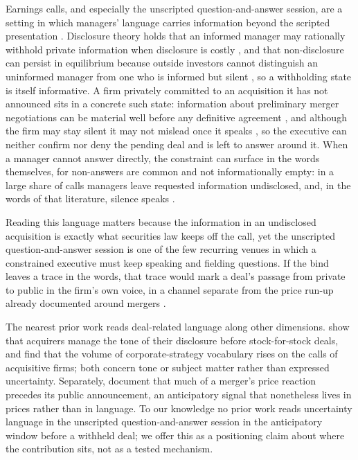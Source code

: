 Earnings calls, and especially the unscripted question-and-answer session, are a setting in which managers' language carries information beyond the scripted presentation \citep{matsumoto2011}. Disclosure theory holds that an informed manager may rationally withhold private information when disclosure is costly \citep{verrecchia1983}, and that non-disclosure can persist in equilibrium because outside investors cannot distinguish an uninformed manager from one who is informed but silent \citep{dye1985}, so a withholding state is itself informative. A firm privately committed to an acquisition it has not announced sits in a concrete such state: information about preliminary merger negotiations can be material well before any definitive agreement \citep{basic1988}, and although the firm may stay silent it may not mislead once it speaks \citep{rule10b5, basic1988}, so the executive can neither confirm nor deny the pending deal and is left to answer around it. When a manager cannot answer directly, the constraint can surface in the words themselves, for non-answers are common and not informationally empty: in a large share of calls managers leave requested information undisclosed, and, in the words of that literature, silence speaks \citep{hollander2010}.

Reading this language matters because the information in an undisclosed acquisition is exactly what securities law keeps off the call, yet the unscripted question-and-answer session is one of the few recurring venues in which a constrained executive must keep speaking and fielding questions. If the bind leaves a trace in the words, that trace would mark a deal's passage from private to public in the firm's own voice, in a channel separate from the price run-up already documented around mergers \citep{keown1981}.

The nearest prior work reads deal-related language along other dimensions. \citet{thewissen2024} show that acquirers manage the tone of their disclosure before stock-for-stock deals, and \citet{ragozzino2024} find that the volume of corporate-strategy vocabulary rises on the calls of acquisitive firms; both concern tone or subject matter rather than expressed uncertainty. Separately, \citet{keown1981} document that much of a merger's price reaction precedes its public announcement, an anticipatory signal that nonetheless lives in prices rather than in language. To our knowledge no prior work reads uncertainty language in the unscripted question-and-answer session in the anticipatory window before a withheld deal; we offer this as a positioning claim about where the contribution sits, not as a tested mechanism.


